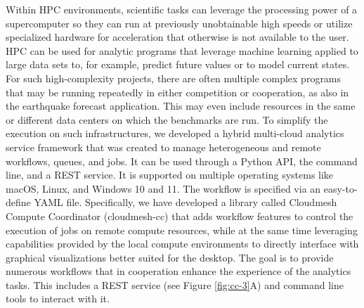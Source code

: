 \documentclass[utf8]{FrontiersinVancouver} %
\begin{document}
Within HPC environments, scientific tasks can leverage the processing power of a supercomputer so they can run at previously unobtainable high speeds or utilize specialized hardware for acceleration that otherwise is not available to the user. HPC can be used for analytic programs that leverage machine learning applied to large data sets to, for example, predict future values or to model current states. For such high-complexity projects, there are often multiple complex programs that may be running repeatedly in either competition or cooperation, as also in the earthquake forecast application.  This may even include resources in the same or different data centers on which the benchmarks are run. To simplify the execution on such infrastructures, we developed a hybrid multi-cloud analytics service framework that was created to manage heterogeneous and remote workflows, queues, and jobs.  It can be used through a Python API, the command line, and a REST service. It is supported on multiple operating systems like macOS, Linux, and Windows 10 and 11.  The workflow is specified via an easy-to-define YAML file.  Specifically, we have developed a library called Cloudmesh Compute Coordinator (cloudmesh-cc) \citep{las-22-arxiv-workflow-cc} that adds workflow features to control the execution of jobs on remote compute resources, while at the same time leveraging capabilities provided by the local compute environments to directly interface with graphical visualizations better suited for the desktop. The goal is to provide numerous workflows that in cooperation enhance the experience of the analytics tasks. This includes a REST service (see Figure \ref{fig:cc-3}A) and command line tools to interact with it.
\end{document}
